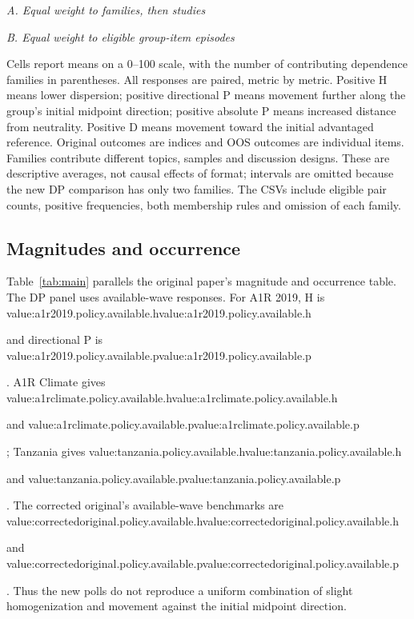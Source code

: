 \documentclass[11pt]{article}
\newcommand{\valueof}[1]{\ifcsname value:#1\endcsname\csname value:#1\endcsname\else\PackageError{oos}{Missing generated value #1}{Run make oos-paper}\fi}
\newcommand{\pollvalue}[2]{\valueof{#1.policy.available.#2}}
\begin{document}
\begin{landscape}
\begin{table}[p]\centering\small
\caption{Overall comparison of original DPs, new DPs and other group discussions}
\label{tab:overall}
\textit{A. Equal weight to families, then studies}\par
\par\bigskip
\textit{B. Equal weight to eligible group-item episodes}\par
\par\medskip
\begin{minipage}{.96\linewidth}\footnotesize
Cells report means on a 0--100 scale, with the number of contributing dependence
families in parentheses. All responses are paired, metric by metric. Positive H
means lower dispersion; positive directional P means movement further along the
group's initial midpoint direction; positive absolute P means increased distance
from neutrality. Positive D means movement toward the initial advantaged reference.
Original outcomes are indices and OOS outcomes are individual items. Families
contribute different topics, samples and discussion designs. These are descriptive
averages, not causal effects of format; intervals are omitted because the new DP
comparison has only two families. The CSVs include eligible pair counts, positive
frequencies, both membership rules and omission of each family.
\end{minipage}
\end{table}
\end{landscape}

\subsection{Magnitudes and occurrence}
Table~\ref{tab:main} parallels the original paper's magnitude and occurrence table.
The DP panel uses available-wave responses. For A1R 2019, H is \pollvalue{a1r2019}{h} and directional P is
\pollvalue{a1r2019}{p}. A1R Climate gives \pollvalue{a1rclimate}{h} and
\pollvalue{a1rclimate}{p}; Tanzania gives \pollvalue{tanzania}{h} and
\pollvalue{tanzania}{p}. The corrected original's available-wave benchmarks are
\pollvalue{correctedoriginal}{h} and \pollvalue{correctedoriginal}{p}.
Thus the new polls do not reproduce a uniform combination of slight homogenization
and movement against the initial midpoint direction.
\end{document}

